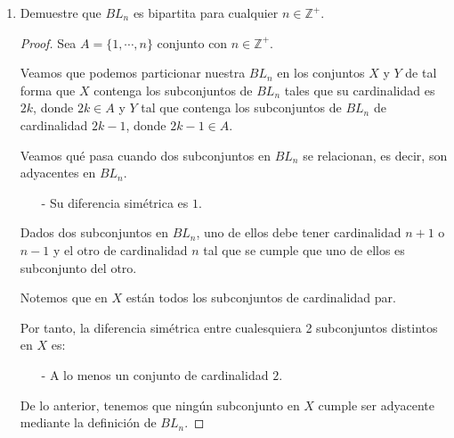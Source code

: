 \documentclass{article}
\begin{document}
\begin{enumerate}
\begin{enumerate}
    Luego hay $n$ aristas por cada v\'ertice (los cu\'ales son
    $2^n$, como ya vimos) y por el inciso ($c$) tenemos que
    $BL_n$ es bipartita. Esto aunado al hecho de que es
    $n$-regular, nos da partes en $BL_n$ de igual
    cardinalidad. De lo anterior hay una cantidad de aristas
    igual a $n$ por cada una de las partes. Es decir:
    \begin{eqnarray*}
      |E_{BL_n}| &=& n \cdot \frac{2^n}{2}\\
      &=& n \cdot 2^{n - 1}
    \end{eqnarray*}


    \hspace*{4 cm} $\therefore\ \ \ \ \ \abs{V_{BL_n}} = 2^n
    \text{ y } |E_{BL_n}| = n \cdot 2^{n -1}$
    \hfill $\square$

  \item Demuestre que $BL_n$ es bipartita para cualquier $n \in \mathbb{Z}^+$.

    \begin{proof}
      
      Sea $A = \{1, \dotsm,n\}$ conjunto con $n \in \mathbb{Z}^+$.
      
      Veamos que podemos particionar nuestra $BL_n$ en los conjuntos
      $X$ y $Y$ de tal forma que $X$ contenga los subconjuntos de
      $BL_n$ tales que su cardinalidad es $2k$, donde $2k \in A$  y
      $Y$ tal que contenga los subconjuntos de $BL_n$ de cardinalidad
      $2k -1$, donde $2k -1 \in A$. 

      Veamos qu\'e pasa cuando dos subconjuntos en $BL_n$ se relacionan,
      es decir, son adyacentes en $BL_n$.

      \begin{itemize}
      \item[-] Su diferencia sim\'etrica es $1$.
      \end{itemize}

      Dados dos subconjuntos en $BL_n$, uno de ellos debe tener cardinalidad
      $n+1$ o $n-1$ y el otro de cardinalidad $n$ tal que se cumple que uno
      de ellos es subconjunto del otro. 

      Notemos que en $X$ est\'an todos los subconjuntos de cardinalidad par.
      
      Por tanto, la diferencia sim\'etrica entre cualesquiera 2 subconjuntos
      distintos en $X$ es:
      \begin{itemize}
      \item[-] A lo menos un conjunto de cardinalidad $2$.
      \end{itemize}
      De lo anterior, tenemos que ning\'un subconjunto en
      $X$ cumple ser adyacente mediante la definici\'on de $BL_n$.


\end{proof}
\end{enumerate}
\end{enumerate}
\end{document}
